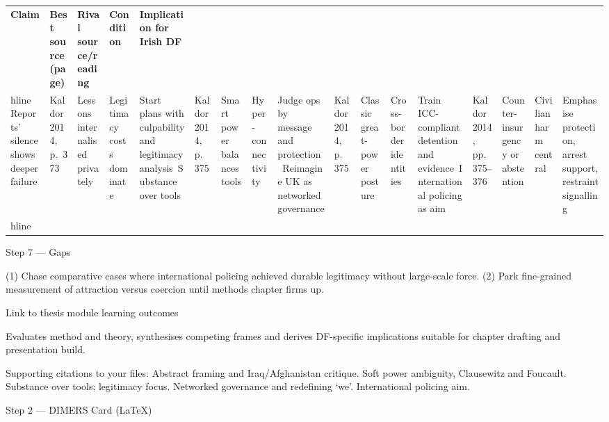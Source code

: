 \usepackage{array}
\begin{tabular}{p{3.2cm}p{4.2cm}p{3.6cm}p{3.2cm}p{4.2cm}}
	\textbf{Claim} & \textbf{Best source (page)} & \textbf{Rival source/reading} & \textbf{Condition} & \textbf{Implication for Irish DF}\\hline
	Reports’ silence shows deeper failure & Kaldor 2014, p.~373 & Lessons internalised privately & Legitimacy costs dominate & Start plans with culpability and legitimacy analysis\
	Substance over tools & Kaldor 2014, p.~375 & Smart power balances tools & Hyper-connectivity & Judge ops by message and protection\
	Reimagine UK as networked governance & Kaldor 2014, p.~375 & Classic great-power posture & Cross-border identities & Train ICC-compliant detention and evidence\
	International policing as aim & Kaldor 2014, pp.~375–376 & Counter-insurgency or abstention & Civilian harm central & Emphasise protection, arrest support, restraint signalling\\hline
\end{tabular}

Step 7 — Gaps

(1) Chase comparative cases where international policing achieved durable legitimacy without large-scale force.
(2) Park fine-grained measurement of attraction versus coercion until methods chapter firms up.

Link to thesis module learning outcomes

Evaluates method and theory, synthesises competing frames and derives DF-specific implications suitable for chapter drafting and presentation build.

Supporting citations to your files:
Abstract framing and Iraq/Afghanistan critique.
Soft power ambiguity, Clausewitz and Foucault.
Substance over tools; legitimacy focus.
Networked governance and redefining ‘we’.
International policing aim.

\parencite{RANGELOV_2012}

Step 2 — DIMERS Card (LaTeX)

